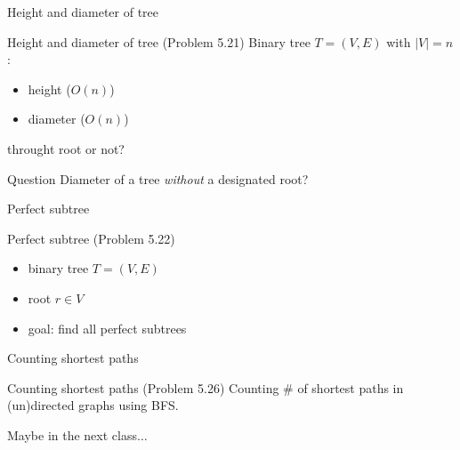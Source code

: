 \begin{frame}{Height and diameter of tree}
  \begin{exampleblock}{Height and diameter of tree (Problem 5.21)}
	Binary tree $T = (V, E)$ with $|V| = n$:
	\begin{itemize}
	  \item height ($O(n)$)
	  \item diameter ($O(n)$)
	\end{itemize}
  \end{exampleblock}

  \pause
  \vspace{0.30cm}
  \centerline{throught root or not?}

  \pause
  \vspace{0.50cm}
  \begin{alertblock}{Question}
	Diameter of a tree \emph{without} a designated root?
  \end{alertblock}
\end{frame}
\begin{frame}{Perfect subtree}
  \begin{exampleblock}{Perfect subtree (Problem 5.22)}
	\begin{itemize}
	  \item binary tree $T = (V, E)$
	  \item root $r \in V$
	  \item goal: find all perfect subtrees
	\end{itemize}
  \end{exampleblock}
\end{frame}
\begin{frame}{Counting shortest paths}
  \begin{exampleblock}{Counting shortest paths (Problem 5.26)}
	Counting \# of shortest paths in (un)directed graphs using BFS.
  \end{exampleblock}

  \pause
  \vspace{0.50cm}
  \centerline{Maybe in the next class$\dots$}
\end{frame}
